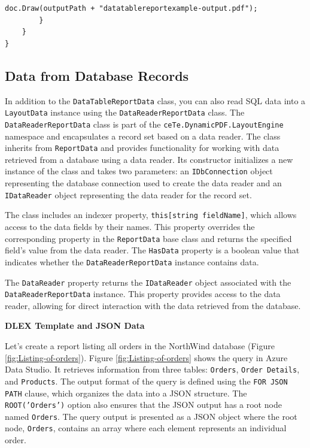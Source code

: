 \documentclass[american,letterpaper]{tufte-book}
\numberwithin{equation}{section}
\numberwithin{figure}{section}
\begin{document}
{{\begin{lstlisting}[caption={Report using database table.},label={lis:Report-using-database},basicstyle={\small\ttfamily},breaklines=true]
            doc.Draw(outputPath + "datatablereportexample-output.pdf");
        }
    }
}
\end{lstlisting}
\leavevmode\egroup


\subsection{Data from Database Records}

In addition to the \texttt{DataTableReportData} class, you can also
read SQL data into a \texttt{LayoutData} instance using the \texttt{DataReaderReportData}
class. The \texttt{DataReaderReportData} class is part of the \texttt{ceTe.DynamicPDF.LayoutEngine}
namespace and encapsulates a record set based on a data reader. The
class inherits from \texttt{ReportData} and provides functionality
for working with data retrieved from a database using a data reader.
Its constructor initializes a new instance of the class and takes
two parameters: an \texttt{IDbConnection} object representing the
database connection used to create the data reader and an \texttt{IDataReader}
object representing the data reader for the record set.

The class includes an indexer property, \texttt{this[string fieldName]},
which allows access to the data fields by their names. This property
overrides the corresponding property in the \texttt{ReportData} base
class and returns the specified field's value from the data reader.
The \texttt{HasData} property is a boolean value that indicates whether
the \texttt{DataReaderReportData} instance contains data.

The \texttt{DataReader} property returns the \texttt{IDataReader}
object associated with the \texttt{DataReaderReportData} instance.
This property provides access to the data reader, allowing for direct
interaction with the data retrieved from the database.
\noindent\begin{flushleft}
\textbf{DLEX Template and JSON Data}
\par\end{flushleft}

Let's create a report listing all orders in the NorthWind database
(Figure \ref{fig:Listing-of-orders}). Figure \ref{fig:Listing-of-orders}
shows the query in Azure Data Studio. It retrieves information from
three tables: \texttt{Orders}, \texttt{Order Details}, and \texttt{Products}.
The output format of the query is defined using the \texttt{FOR JSON
PATH} clause, which organizes the data into a JSON structure. The
\texttt{ROOT('Orders')} option also ensures that the JSON output has
a root node named \texttt{Orders}. The query output is presented as
a JSON object where the root node, \texttt{Orders}, contains an array
where each element represents an individual order.

}}
\end{document}
